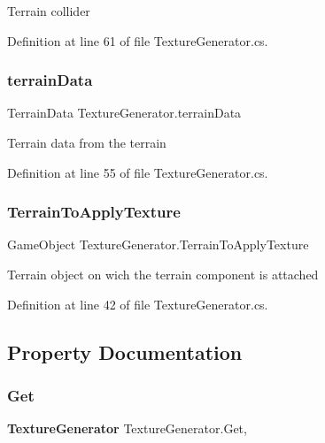 Terrain collider 



Definition at line 61 of file Texture\+Generator.\+cs.

\mbox{\label{class_texture_generator_a67f9f1f5bc75fd09eba30469a04c367d}} 
\subsubsection{terrain\+Data}
{\footnotesize\ttfamily Terrain\+Data Texture\+Generator.\+terrain\+Data}



Terrain data from the terrain 



Definition at line 55 of file Texture\+Generator.\+cs.

\mbox{\label{class_texture_generator_a30e197ac5865821ee8bd0063549c242d}} 
\subsubsection{Terrain\+To\+Apply\+Texture}
{\footnotesize\ttfamily Game\+Object Texture\+Generator.\+Terrain\+To\+Apply\+Texture}



Terrain object on wich the terrain component is attached 



Definition at line 42 of file Texture\+Generator.\+cs.



\subsection{Property Documentation}
\mbox{\label{class_texture_generator_a67bbe601e5d108348b6d811be6e92143}} 
\subsubsection{Get}
{\footnotesize\ttfamily \textbf{ Texture\+Generator} Texture\+Generator.\+Get\hspace{0.3cm}{\ttfamily [static]}, {\ttfamily [get]}}



